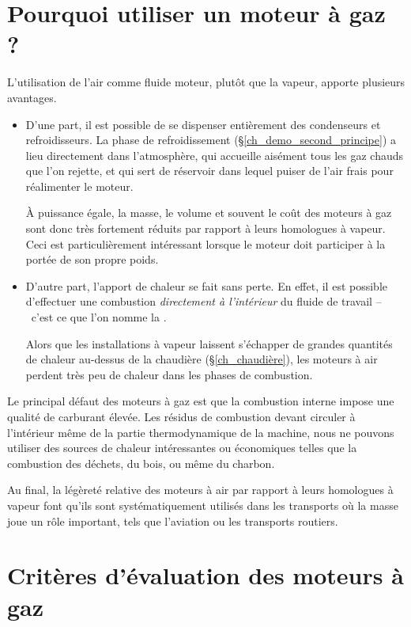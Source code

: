 \section{Pourquoi utiliser un moteur à gaz ?}

	L’utilisation de l’air comme fluide moteur, plutôt que la vapeur, apporte plusieurs avantages.

	\begin{itemize}
		\item D’une part, il est possible de se dispenser entièrement des condenseurs et refroidisseurs. La phase de refroidissement (\S\ref{ch_demo_second_principe}) a lieu directement dans l’atmosphère, qui accueille aisément tous les gaz chauds que l’on rejette, et qui sert de réservoir dans lequel puiser de l’air frais pour réalimenter le moteur.

		À puissance égale, la masse, le volume et souvent le coût des moteurs à gaz sont donc très fortement réduits par rapport à leurs homologues à vapeur. Ceci est particulièrement intéressant lorsque le moteur doit participer à la portée de son propre poids.

		\item D’autre part, l’apport de chaleur se fait sans perte. En effet, il est possible d’effectuer une combustion \emph{directement à l’intérieur} du fluide de travail --\ c’est ce que l’on nomme la .

		Alors que les installations à vapeur laissent s’échapper de grandes quantités de chaleur au-dessus de la chaudière (\S\ref{ch_chaudière}), les moteurs à air perdent très peu de chaleur dans les phases de combustion.
	\end{itemize}

	Le principal défaut des moteurs à gaz est que la combustion interne impose une qualité de carburant élevée. Les résidus de combustion devant circuler à l’intérieur même de la partie thermodynamique de la machine, nous ne pouvons utiliser des sources de chaleur intéressantes ou économiques telles que la combustion des déchets, du bois, ou même du charbon.

	Au final, la légèreté relative des moteurs à air par rapport à leurs homologues à vapeur font qu’ils sont systématiquement utilisés dans les transports où la masse joue un rôle important, tels que l’aviation ou les transports routiers.



\section{Critères d’évaluation des moteurs à gaz}
\label{ch_criteres_evaluation_moteurs_gaz}

